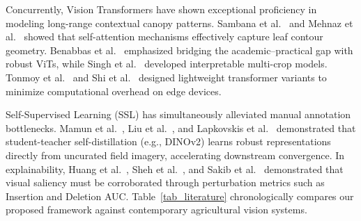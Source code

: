 \documentclass[runningheads]{llncs}
\begin{document}
Concurrently, Vision Transformers have shown exceptional proficiency in modeling long-range contextual canopy patterns. Sambana et al.~\cite{ref_sambana2025} and Mehnaz et al.~\cite{ref_mehnaz2025} showed that self-attention mechanisms effectively capture leaf contour geometry. Benabbas et al.~\cite{ref_benabbas2025} emphasized bridging the academic--practical gap with robust ViTs, while Singh et al.~\cite{ref_singh2025} developed interpretable multi-crop models. Tonmoy et al.~\cite{ref_tonmoy2025} and Shi et al.~\cite{ref_shi2024} designed lightweight transformer variants to minimize computational overhead on edge devices.

Self-Supervised Learning (SSL) has simultaneously alleviated manual annotation bottlenecks. Mamun et al.~\cite{ref_mamun2025}, Liu et al.~\cite{ref_liu2025}, and Lapkovskis et al.~\cite{ref_lapkovskis2024} demonstrated that student-teacher self-distillation (e.g., DINOv2) learns robust representations directly from uncurated field imagery, accelerating downstream convergence. In explainability, Huang et al.~\cite{ref_huang2024}, Sheh et al.~\cite{ref_sheh2026}, and Sakib et al.~\cite{ref_sakib2026} demonstrated that visual saliency must be corroborated through perturbation metrics such as Insertion and Deletion AUC. Table~\ref{tab_literature} chronologically compares our proposed framework against contemporary agricultural vision systems.
\end{document}
